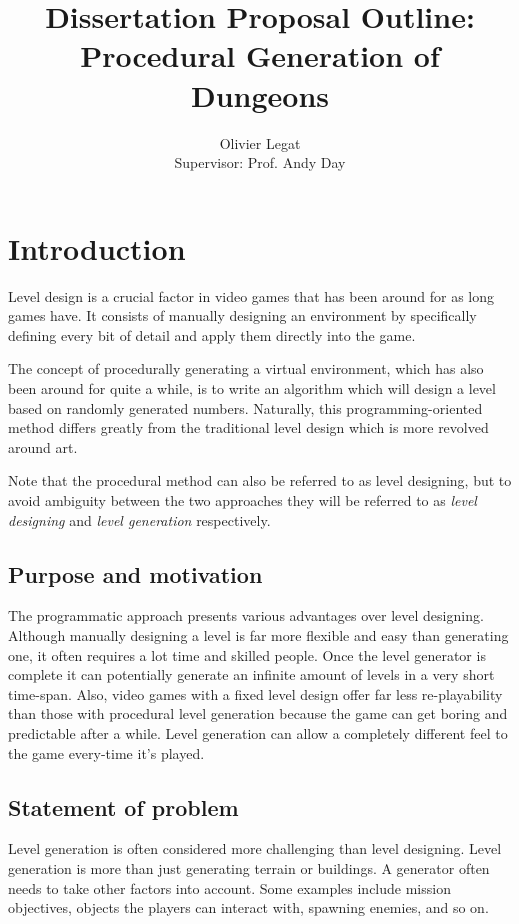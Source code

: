 \documentclass{ueacmpstyle}
\begin{document}
\title{Dissertation Proposal Outline: \\ Procedural Generation of Dungeons}
\author{Olivier Legat \\ Supervisor: Prof. Andy Day}
\maketitle

\section{Introduction}
Level design is a crucial factor in video games that has been around for as long games have. It consists of manually designing an environment by specifically defining every bit of detail and apply them directly into the game.

The concept of procedurally generating a virtual environment, which has also been around for quite a while, is to write an algorithm which will design a level based on randomly generated numbers. Naturally, this programming-oriented method differs greatly from the traditional level design which is more revolved around art.

Note that the procedural method can also be referred to as level designing, but to avoid ambiguity between the two approaches they will be referred to as {\em level designing} and {\em level generation} respectively.

\subsection{Purpose and motivation}
The programmatic approach presents various advantages over level designing. Although manually designing a level is far more flexible and easy than generating one, it often requires a lot time and skilled people. Once the level generator is complete it can potentially generate an infinite amount of levels in a very short time-span. Also, video games with a fixed level design offer far less re-playability than those with procedural level generation because the game can get boring and predictable after a while. Level generation can allow a completely different feel to the game every-time it's played.

\subsection{Statement of problem}
Level generation is often considered more challenging than level designing. Level generation is more than just generating terrain or buildings. A generator often needs to take other factors into account. Some examples include mission objectives, objects the players can interact with, spawning enemies, and so on. 
\end{document}
